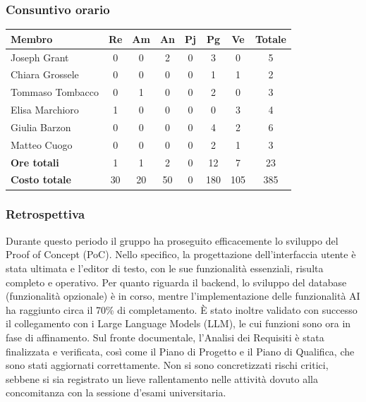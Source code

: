 \documentclass[11pt,a4paper]{article}
\begin{document}
\subsubsection{Consuntivo orario}
\begin{center}
    \begin{tabular}{|l|c|c|c|c|c|c|c|}
        \hline
        \textbf{Membro} & \textbf{Re} & \textbf{Am} & \textbf{An} & \textbf{Pj} & \textbf{Pg} & \textbf{Ve} & \textbf{Totale} \\
        \hline
        Joseph Grant & 0 & 0 & 2 & 0 & 3 & 0 & 5 \\
        \hline
        Chiara Grossele & 0 & 0 & 0 & 0 & 1 & 1 & 2 \\
        \hline
        Tommaso Tombacco & 0 & 1 & 0 & 0 & 2 & 0 & 3 \\
        \hline
        Elisa Marchioro & 1 & 0 & 0 & 0 & 0 & 3 & 4 \\
        \hline
        Giulia Barzon & 0 & 0 & 0 & 0 & 4 & 2 & 6 \\
        \hline
        Matteo Cuogo & 0 & 0 & 0 & 0 & 2 & 1 & 3 \\
        \hline
        \textbf{Ore totali} & 1 & 1 & 2 & 0 & 12 & 7 & 23 \\
        \hline
        \textbf{Costo totale} & 30 & 20 & 50 & 0 & 180 & 105 & 385 \\
        \hline
    \end{tabular}
\end{center}

\subsubsection{Retrospettiva}
Durante questo periodo il gruppo ha proseguito efficacemente lo sviluppo del Proof of Concept (PoC). Nello specifico, la progettazione dell'interfaccia utente è stata ultimata e l'editor di testo, con le sue funzionalità essenziali, risulta completo e operativo. Per quanto riguarda il backend, lo sviluppo del database (funzionalità opzionale) è in corso, mentre l'implementazione delle funzionalità AI ha raggiunto circa il 70\% di completamento. È stato inoltre validato con successo il collegamento con i Large Language Models (LLM), le cui funzioni sono ora in fase di affinamento.
Sul fronte documentale, l'Analisi dei Requisiti è stata finalizzata e verificata, così come il Piano di Progetto e il Piano di Qualifica, che sono stati aggiornati correttamente.
Non si sono concretizzati rischi critici, sebbene si sia registrato un lieve rallentamento nelle attività dovuto alla concomitanza con la sessione d'esami universitaria.
\end{document}
